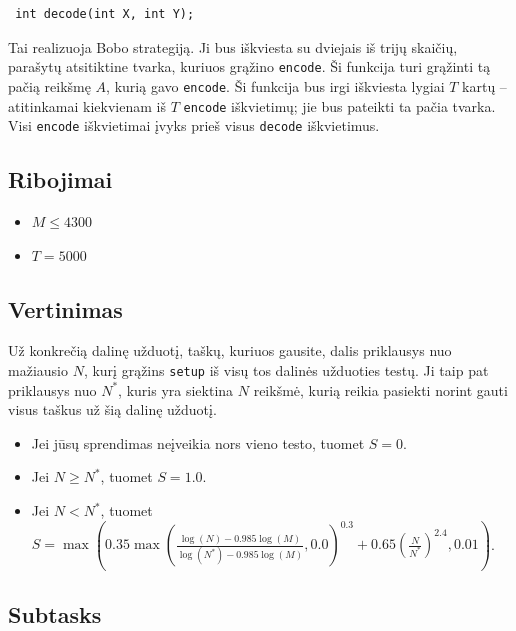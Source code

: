 \documentclass[12pt]{article}
\begin{document}
\begin{lstlisting}
 int decode(int X, int Y);
\end{lstlisting}

Tai realizuoja Bobo strategiją. Ji bus iškviesta su dviejais iš trijų skaičių, parašytų atsitiktine tvarka, kuriuos grąžino \texttt{encode}. Ši funkcija turi grąžinti tą pačią reikšmę $A$, kurią gavo \texttt{encode}. Ši funkcija bus irgi iškviesta lygiai $T$ kartų -- atitinkamai kiekvienam iš $T$ \texttt{encode} iškvietimų; jie bus pateikti ta pačia tvarka. Visi \texttt{encode} iškvietimai įvyks prieš visus \texttt{decode} iškvietimus.

\subsection{Ribojimai}

\begin{itemize}
\item $M \leq 4300$
\item $T = 5000$
\end{itemize}

\subsection{Vertinimas}

Už konkrečią dalinę užduotį, taškų, kuriuos gausite, dalis priklausys nuo mažiausio $N$, kurį grąžins \texttt{setup} iš visų tos dalinės užduoties testų. Ji taip pat priklausys nuo $N^*$, kuris yra siektina $N$ reikšmė, kurią reikia pasiekti norint gauti visus taškus už šią dalinę užduotį. 

\begin{itemize}
\item Jei jūsų sprendimas neįveikia nors vieno testo, tuomet  $S = 0$.
\item Jei $N \geq N^*$, tuomet $S = 1.0$.
\item Jei $N < N^*$, tuomet $S = \max\left(0.35 \max\left(\frac{\log(N) - 0.985 \log(M)}{\log(N^*) - 0.985 \log(M)}, 0.0\right)^{0.3} + 0.65 \left(\frac{N}{N^*}\right)^{2.4}, 0.01\right)$.
\end{itemize}

\subsection{Subtasks}
\end{document}
